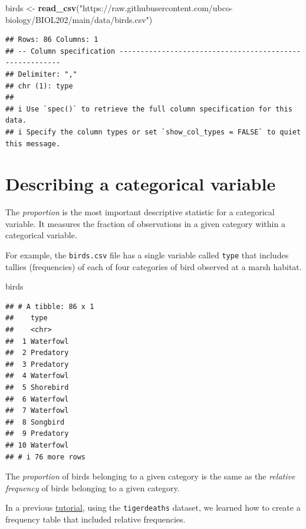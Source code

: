 \documentclass[
]{book}
\newenvironment{Shaded}{\begin{snugshade}}{\end{snugshade}}
\newcommand{\FunctionTok}[1]{\textcolor[rgb]{0.13,0.29,0.53}{\textbf{#1}}}
\newcommand{\NormalTok}[1]{#1}
\newcommand{\OtherTok}[1]{\textcolor[rgb]{0.56,0.35,0.01}{#1}}
\newcommand{\StringTok}[1]{\textcolor[rgb]{0.31,0.60,0.02}{#1}}
\begin{document}
\begin{Shaded}
\begin{Highlighting}[]
\NormalTok{birds }\OtherTok{\textless{}{-}} \FunctionTok{read\_csv}\NormalTok{(}\StringTok{"https://raw.githubusercontent.com/ubco{-}biology/BIOL202/main/data/birds.csv"}\NormalTok{)}
\end{Highlighting}
\end{Shaded}

\begin{verbatim}
## Rows: 86 Columns: 1
## -- Column specification --------------------------------------------------------
## Delimiter: ","
## chr (1): type
## 
## i Use `spec()` to retrieve the full column specification for this data.
## i Specify the column types or set `show_col_types = FALSE` to quiet this message.
\end{verbatim}

\section{Describing a categorical variable}\label{desc_cat_Var}

The \emph{proportion} is the most important descriptive statistic for a categorical variable. It measures the fraction of observations in a given category within a categorical variable.

For example, the \texttt{birds.csv} file has a single variable called \texttt{type} that includes tallies (frequencies) of each of four categories of bird observed at a marsh habitat.

\begin{Shaded}
\begin{Highlighting}[]
\NormalTok{birds}
\end{Highlighting}
\end{Shaded}

\begin{verbatim}
## # A tibble: 86 x 1
##    type     
##    <chr>    
##  1 Waterfowl
##  2 Predatory
##  3 Predatory
##  4 Waterfowl
##  5 Shorebird
##  6 Waterfowl
##  7 Waterfowl
##  8 Songbird 
##  9 Predatory
## 10 Waterfowl
## # i 76 more rows
\end{verbatim}

The \emph{proportion} of birds belonging to a given category is the same as the \emph{relative frequency} of birds belonging to a given category.

In a previous \hyperref[vis_cat_freq_table]{tutorial}, using the \texttt{tigerdeaths} dataset, we learned how to create a frequency table that included relative frequencies.
\end{document}
